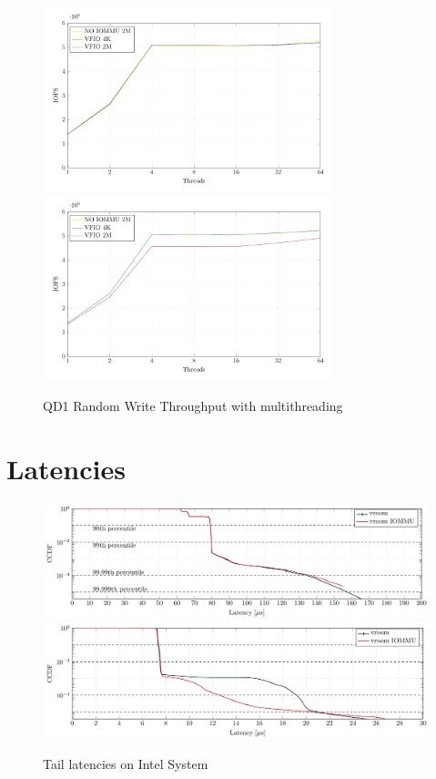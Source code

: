 \begin{figure}[H]
  \centering
   {\includegraphics[width=0.75\textwidth]{figures/qd1tn_1page}}
   {\includegraphics[width=0.75\textwidth]{figures/qd1tn_512page}}
  \caption{QD1 Random Write Throughput with multithreading}
  \label{fig:qd1tn}
\end{figure}

\section{Latencies}

\begin{figure}[H]
  \centering
   {\includegraphics[width=.99\textwidth]{figures/lats_ccdf_2MiB_qd1t1_read} \label{fig:ccdf-read}}
   {\includegraphics[width=.99\textwidth]{figures/lats_ccdf_2MiB_qd1t1} \label{fig:ccdf-write}}
  \caption{Tail latencies on Intel System}
  \label{fig:ccdf}
\end{figure}

